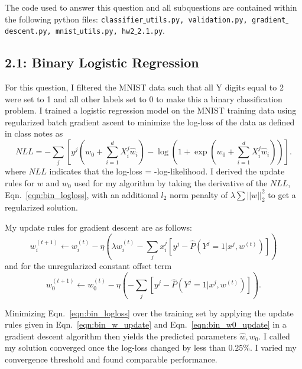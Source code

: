 \documentclass[12pt]{amsart}
\begin{document}
The code used to answer this question and all subquestions are contained within the following python files: {\tt classifier$\_$utils.py, validation.py, gradient$\_$descent.py, mnist$\_$utils.py, hw2$\_$2.1.py}.

\subsection*{2.1: Binary Logistic Regression}

For this question, I filtered the MNIST data such that all Y digits equal to 2 were set to 1 and all other labels set to 0 to make this a binary classification problem.  I trained a logistic regression model on the MNIST training data using regularized batch gradient ascent to minimize the log-loss of the data as defined in class notes as
\begin{equation} \label{eqn:bin_logloss}
NLL = -\sum_j [y^j (w_0 + \sum_{i=1}^d X_i^j \hat{w}_i) - \log(1+ \exp(w_0 + \sum_{i=1}^d X_i^j \hat{w}_i))].
\end{equation}
where $NLL$ indicates that the log-loss = -log-likelihood.  I derived the update rules for $w$ and $w_0$ used for my algorithm by taking the derivative of the $NLL$, Eqn.~\ref{eqn:bin_logloss}, with an additional $l_2$ norm penalty of $\lambda \sum||w||^2_2$ to get a regularized solution.  

My update rules for gradient descent are as follows:
\begin{equation} \label{eqn:bin_w_update}
w^{(t+1)}_i \leftarrow w^{(t)}_i - \eta (\lambda w^{(t)}_i - \sum_j x^j_i[y^j - \hat{P}(Y^j = 1 | x^j, w^{(t)})])
\end{equation}
and for the unregularized constant offset term
\begin{equation} \label{eqn:bin_w0_update}
w^{(t+1)}_0 \leftarrow w^{(t)}_0 - \eta (- \sum_j[y^j - \hat{P}(Y^j = 1 | x^j, w^{(t)})]).
\end{equation}

Minimizing Eqn.~\ref{eqn:bin_logloss} over the training set by applying the update rules given in Eqn.~\ref{eqn:bin_w_update} and Eqn.~\ref{eqn:bin_w0_update} in a gradient descent algorithm then yields the predicted parameters $\hat{w}, w_0$.  I called my solution converged once the log-loss changed by less than $0.25 \%$.  I varied my convergence threshold and found comparable performance.
\end{document}
